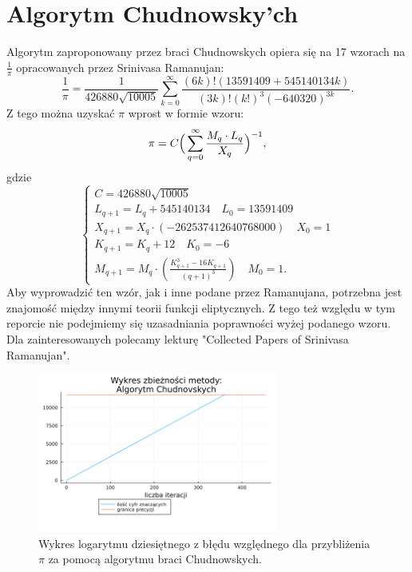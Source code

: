 \section{Algorytm Chudnowsky'ch}

Algorytm zaproponowany przez braci Chudnowskych opiera się na 17 wzorach na $\frac1\pi$ opracowanych przez Srinivasa Ramanujan\cite{review}:
$${\frac {1}{\pi }}={\frac {1}{426880{\sqrt {10005}}}}\sum _{k=0}^{\infty }{\frac {(6k)!(13591409+545140134k)}{(3k)!(k!)^{3}(-640320)^{3k}}}.$$
Z tego można uzyskać $\pi$ wprost w formie wzoru:
$$\pi=C\Big(\sum\limits_{q=0}^\infty{M_q\cdot L_q\over X_q}\Big)^{-1},$$
gdzie 
$$
\begin{cases}
    C=426880\sqrt{10005}\\
    L_{q+1}=L_q+545140134 \quad L_0=13591409  \\
    X_{q+1}=X_q\cdot(-262537412640768000)\quad X_0=1\\
    K_{q+1}=K_q+12\quad K_0=-6\\
    M_{q+1}=M_{q}\cdot \left({\frac {K_{q+1}^{3}-16K_{q+1}}{\left(q+1\right)^{3}}}\right)\quad M_{0}=1.
\end{cases}
$$
Aby wyprowadzić ten wzór, jak i inne podane przez Ramanujana, potrzebna jest znajomość między innymi teorii funkcji eliptycznych\cite{review}. Z tego też względu w tym reporcie nie podejmiemy się uzasadniania poprawności wyżej podanego wzoru. Dla zainteresowanych polecamy lekturę "Collected Papers of Srinivasa Ramanujan"\cite{ramanujan}.

\begin{figure}[!h]
    \centering
    \renewcommand{\figurename}{Wykres}
    \includegraphics[width=0.7\textwidth]{../prog/chudnowsky_log_error.png}
    \caption{Wykres logarytmu dziesiętnego z błędu względnego dla przybliżenia $\pi$ za pomocą algorytmu braci Chudnowskych.}
    \label{chudnowsky-error}
\end{figure}

